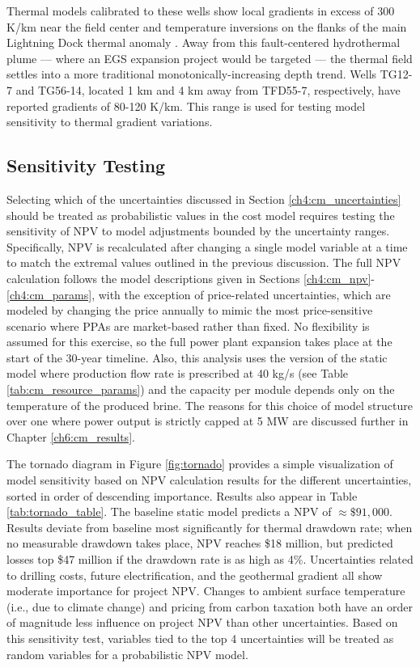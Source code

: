 Thermal models calibrated to these wells show local gradients in excess of 300 K/km near the field center and temperature inversions on the flanks of the main Lightning Dock thermal anomaly \citep[see Figs.\ 23-24]{cunniff_final_2005}. Away from this fault-centered hydrothermal plume --- where an EGS expansion project would be targeted --- the thermal field settles into a more traditional monotonically-increasing depth trend. Wells TG12-7 and TG56-14, located 1 km and 4 km away from TFD55-7, respectively, have reported gradients of 80-120 K/km. This range is used for testing model sensitivity to thermal gradient variations.

\subsection{Sensitivity Testing}\label{ch4:sensitivity}
Selecting which of the uncertainties discussed in Section \ref{ch4:cm_uncertainties} should be treated as probabilistic values in the cost model requires testing the sensitivity of NPV to model adjustments bounded by the uncertainty ranges. Specifically, NPV is recalculated after changing a single model variable at a time to match the extremal values outlined in the previous discussion. The full NPV calculation follows the model descriptions given in Sections \ref{ch4:cm_npv}-\ref{ch4:cm_params}, with the exception of price-related uncertainties, which are modeled by changing the price annually to mimic the most price-sensitive scenario where PPAs are market-based rather than fixed. No flexibility is assumed for this exercise, so the full power plant expansion takes place at the start of the 30-year timeline. Also, this analysis uses the version of the static model where production flow rate is prescribed at 40 kg/s (see Table \ref{tab:cm_resource_params}) and the capacity per module depends only on the temperature of the produced brine. The reasons for this choice of model structure over one where power output is strictly capped at 5 MW are discussed further in Chapter \ref{ch6:cm_results}.

The tornado diagram in Figure \ref{fig:tornado} provides a simple visualization of model sensitivity based on NPV calculation results for the different uncertainties, sorted in order of descending importance. Results also appear in Table \ref{tab:tornado_table}. The baseline static model predicts a NPV of $\approx \$91,000$. Results deviate from baseline most significantly for thermal drawdown rate; when no measurable drawdown takes place, NPV reaches \$18 million, but predicted losses top \$47 million if the drawdown rate is as high as 4\%. Uncertainties related to drilling costs, future electrification, and the geothermal gradient all show moderate importance for project NPV. Changes to ambient surface temperature (i.e., due to climate change) and pricing from carbon taxation both have an order of magnitude less influence on project NPV than other uncertainties. Based on this sensitivity test, variables tied to the top 4 uncertainties will be treated as random variables for a probabilistic NPV model.

